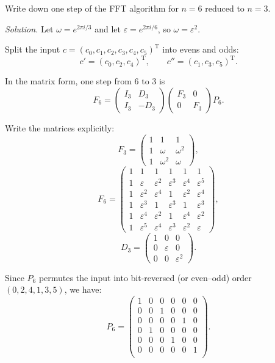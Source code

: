 \begin{problem}
Write down one step of the FFT algorithm for $n = 6$ reduced to $n = 3$.
\end{problem}
\textit{Solution.}
Let $\omega=e^{2\pi i/3}$ and let $\varepsilon=e^{2\pi i/6}$, so $\omega=\varepsilon^2$.

Split the input $c=(c_0,c_1,c_2,c_3,c_4,c_5)^{\mathrm T}$ into evens and odds:
$$
c'=(c_0,c_2,c_4)^{\mathrm T},\qquad c''=(c_1,c_3,c_5)^{\mathrm T}.
$$

In the matrix form, one step from $6$ to $3$ is
$$
F_6=
\begin{pmatrix}
I_3 & D_3\\[2pt]
I_3 & -D_3
\end{pmatrix}
\begin{pmatrix}
F_3 & 0\\
0 & F_3
\end{pmatrix}
P_6.
$$  

Write the matrices explicitly:
$$
F_3=\begin{pmatrix}
1 & 1 & 1\\
1 & \omega & \omega^2\\
1 & \omega^2 & \omega
\end{pmatrix},
$$
$$
F_6=\begin{pmatrix}
1 & 1 & 1 & 1 & 1 & 1\\
1 & \varepsilon & \varepsilon^2 & \varepsilon^3 & \varepsilon^4 & \varepsilon^5\\
1 & \varepsilon^2 & \varepsilon^4 & 1 & \varepsilon^2 & \varepsilon^4\\
1 & \varepsilon^3 & 1 & \varepsilon^3 & 1 & \varepsilon^3\\
1 & \varepsilon^4 & \varepsilon^2 & 1 & \varepsilon^4 & \varepsilon^2\\
1 & \varepsilon^5 & \varepsilon^4 & \varepsilon^3 & \varepsilon^2 & \varepsilon
\end{pmatrix},
$$
$$
D_3 = \begin{pmatrix}
1 & 0 & 0\\
0 & \varepsilon & 0\\
0 & 0 & \varepsilon^2
\end{pmatrix}.
$$

Since $P_6$ permutes the input into bit-reversed (or even–odd) order $(0,2,4,1,3,5)$, we have:
$$
P_6 = \begin{pmatrix}
1 & 0 & 0 & 0 & 0 & 0\\
0 & 0 & 1 & 0 & 0 & 0\\
0 & 0 & 0 & 0 & 1 & 0\\
0 & 1 & 0 & 0 & 0 & 0\\
0 & 0 & 0 & 1 & 0 & 0\\
0 & 0 & 0 & 0 & 0 & 1\\
\end{pmatrix}.
$$

